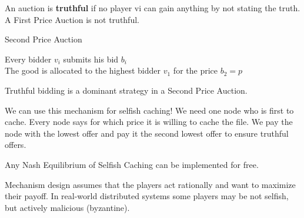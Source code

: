 An auction is \textbf{truthful} if no player vi can gain anything by not stating the truth. A First Price Auction is not truthful. \medskip

\begin{algorithm}[H]
\caption{Second Price Auction}
	Every bidder $v_i$ submits his bid $b_i$\\
	The good is allocated to the highest bidder $v_1$ for the price $b_2 = p$
\end{algorithm}
\medskip

Truthful bidding is a dominant strategy in a Second Price Auction. \medskip

We can use this mechanism for selfish caching! We need one node who is first to cache. Every node says for which price it is willing to cache the file. We pay the node with the lowest offer and pay it the second lowest offer to ensure truthful offers. \medskip

Any Nash Equilibrium of Selfish Caching can be implemented for free. \medskip

Mechanism design assumes that the players act rationally and want to maximize their payoff. In real-world distributed systems some players may be not selfish, but actively malicious (byzantine).
